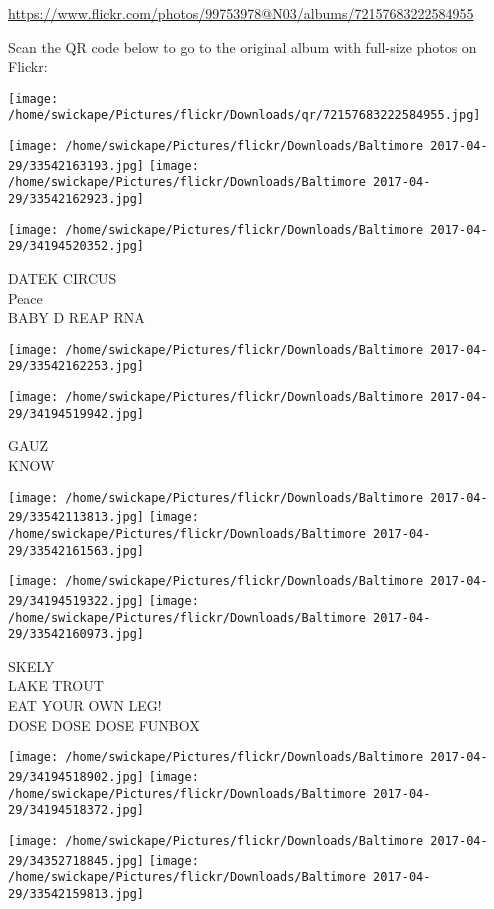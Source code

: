 \documentclass[10pt,letterpaper]{article}
\begin{document}
\url{https://www.flickr.com/photos/99753978@N03/albums/72157683222584955}

Scan the QR code below to go to the original album with full-size photos on Flickr:

\texttt{[image: /home/swickape/Pictures/flickr/Downloads/qr/72157683222584955.jpg]}
\pagebreak

\texttt{[image: /home/swickape/Pictures/flickr/Downloads/Baltimore 2017-04-29/33542163193.jpg]}
\texttt{[image: /home/swickape/Pictures/flickr/Downloads/Baltimore 2017-04-29/33542162923.jpg]}

\texttt{[image: /home/swickape/Pictures/flickr/Downloads/Baltimore 2017-04-29/34194520352.jpg]}

DATEK CIRCUS\\
Peace\\
BABY D REAP RNA
\pagebreak

\texttt{[image: /home/swickape/Pictures/flickr/Downloads/Baltimore 2017-04-29/33542162253.jpg]}

\vspace{0.25in}
\texttt{[image: /home/swickape/Pictures/flickr/Downloads/Baltimore 2017-04-29/34194519942.jpg]}

GAUZ\\
KNOW
\pagebreak

\texttt{[image: /home/swickape/Pictures/flickr/Downloads/Baltimore 2017-04-29/33542113813.jpg]}
\texttt{[image: /home/swickape/Pictures/flickr/Downloads/Baltimore 2017-04-29/33542161563.jpg]}

\texttt{[image: /home/swickape/Pictures/flickr/Downloads/Baltimore 2017-04-29/34194519322.jpg]}
\texttt{[image: /home/swickape/Pictures/flickr/Downloads/Baltimore 2017-04-29/33542160973.jpg]}

SKELY\\
LAKE TROUT\\
EAT YOUR OWN LEG!\\
DOSE DOSE DOSE FUNBOX
\pagebreak

\texttt{[image: /home/swickape/Pictures/flickr/Downloads/Baltimore 2017-04-29/34194518902.jpg]}
\texttt{[image: /home/swickape/Pictures/flickr/Downloads/Baltimore 2017-04-29/34194518372.jpg]}

\texttt{[image: /home/swickape/Pictures/flickr/Downloads/Baltimore 2017-04-29/34352718845.jpg]}
\texttt{[image: /home/swickape/Pictures/flickr/Downloads/Baltimore 2017-04-29/33542159813.jpg]}
\end{document}
